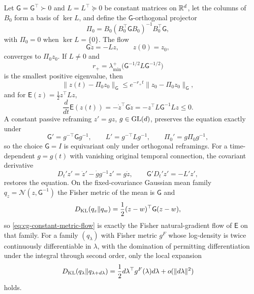 Let \(\mathsf G=\mathsf G^\top\succ0\) and \(L=L^\top\succeq0\) be constant
matrices on \(\mathbb R^d\), let the columns of \(B_0\) form a basis of \(\ker L\), and
define the \(\mathsf G\)-orthogonal projector
\begin{equation}
\Pi_0=B_0(B_0^\top\mathsf GB_0)^{-1}B_0^\top\mathsf G,
\label{eq:cg-r-projector}
\end{equation}
with \(\Pi_0=0\) when \(\ker L=\{0\}\). The flow
\begin{equation}
\mathsf G\dot z=-Lz,\qquad z(0)=z_0,
\label{eq:cg-constant-metric-flow}
\end{equation}
converges to \(\Pi_0z_0\). If \(L\neq0\) and
\begin{equation}
r_+=\lambda_{\min}^{+}\bigl(\mathsf G^{-1/2}L\mathsf G^{-1/2}\bigr)
\label{eq:cg-transverse-rate}
\end{equation}
is the smallest positive eigenvalue, then
\begin{equation}
\|z(t)-\Pi_0z_0\|_{\mathsf G}
\leq e^{-r_+t}
\|z_0-\Pi_0z_0\|_{\mathsf G},
\label{eq:cg-transverse-decay}
\end{equation}
and for \(\mathsf E(z)=\frac12z^\top Lz\),
\begin{equation}
\frac{d}{dt}\mathsf E(z(t))
=-\dot z^\top\mathsf G\dot z
=-z^\top L\mathsf G^{-1}Lz\leq0.
\label{eq:cg-fixed-flow-dissipation}
\end{equation}
A constant passive reframing \(z'=gz\), \(g\in\mathrm{GL}(d)\), preserves the equation
exactly under
\begin{equation}
\mathsf G'=g^{-\top}\mathsf Gg^{-1},\qquad
L'=g^{-\top}Lg^{-1},\qquad
\Pi_0'=g\Pi_0g^{-1},
\label{eq:cg-flow-congruence}
\end{equation}
so the choice \(\mathsf G=I\) is equivariant only under orthogonal reframings.
For a time-dependent \(g=g(t)\) with vanishing original temporal connection, the
covariant derivative
\begin{equation}
D_t'z'=\dot z'-\dot gg^{-1}z'=g\dot z,
\qquad \mathsf G'D_t'z'=-L'z',
\label{eq:cg-time-covariant-flow}
\end{equation}
restores the equation. On the fixed-covariance Gaussian mean family
\(q_z=\mathcal N(z,\mathsf G^{-1})\) the Fisher metric of the mean is
\(\mathsf G\) and
\begin{equation}
D_{\mathrm{KL}}(q_z\Vert q_w)
=\frac12(z-w)^\top\mathsf G(z-w),
\label{eq:cg-fixed-covariance-kl}
\end{equation}
so \eqref{eq:cg-constant-metric-flow} is exactly the Fisher natural-gradient
flow of \(\mathsf E\) on that family. For a family \((q_\lambda)\) with Fisher
metric \(g^F\) whose log-density is twice continuously differentiable in
\(\lambda\), with the domination of  permitting
differentiation under the integral through second order, only the local
expansion
\begin{equation}
D_{\mathrm{KL}}(q_\lambda\Vert q_{\lambda+d\lambda})
=\frac12d\lambda^\top g^F(\lambda)d\lambda
+o(\|d\lambda\|^2)
\label{eq:cg-local-fisher-kl}
\end{equation}
holds. 

